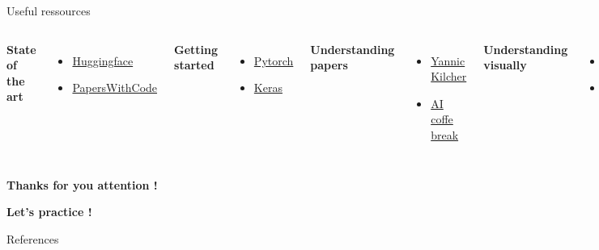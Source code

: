 \documentclass{irdbeamer}
\begin{document}
\begin{frame}{Useful ressources}
\begin{columns}[t]
    \textbf{State of the art}
    \begin{itemize}
        \item \href{https://huggingface.co/}{Huggingface}
        \item \href{https://paperswithcode.com/sota}{PapersWithCode}
    \end{itemize}
    \textbf{Getting started}
    \begin{itemize}
        \item \href{https://docs.pytorch.org/tutorials/}{Pytorch}
        \item \href{https://keras.io/getting_started/}{Keras}
    \end{itemize}
    \textbf{Understanding papers}
    \begin{itemize}
        \item \href{https://www.youtube.com/@YannicKilcher}{Yannic Kilcher}
        \item \href{https://www.youtube.com/@AICoffeeBreak}{AI coffe break}
    \end{itemize}
    \textbf{Understanding visually}
    \begin{itemize}
        \item \href{https://www.youtube.com/@3blue1brown}{3blue1brown}
        \item \href{https://www.youtube.com/@Deepia-ls2fo}{deepia}
    \end{itemize}
\end{columns}

\end{frame}

\begin{frame}[plain]
    \Huge{\textbf{Thanks for you attention !}}
    
    \vfill
    
    \LARGE{\textbf{Let's practice !}}
\end{frame}

\appendix
\begin{frame}[allowframebreaks]{References}
    {\footnotesize \printbibliography[heading=none]}
\end{frame}
\end{document}
